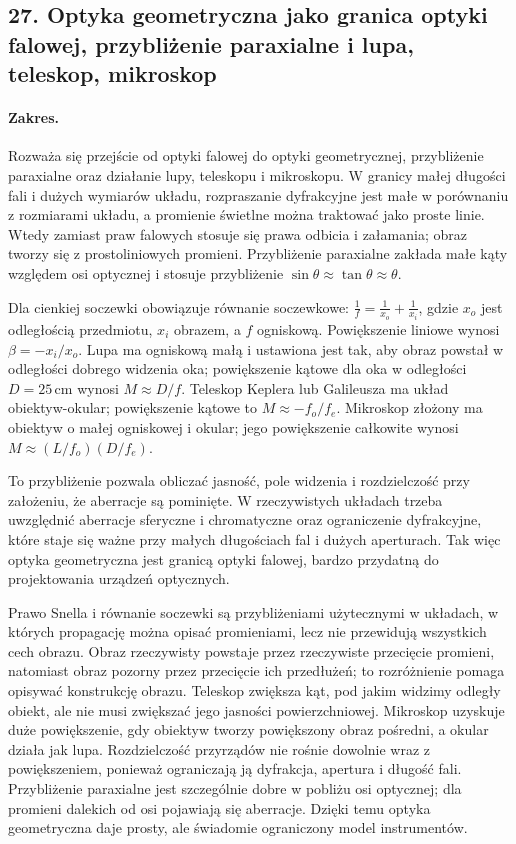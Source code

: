 \documentclass[11pt,a4paper]{article}
\begin{document}
\subsection{27. Optyka geometryczna jako granica optyki falowej, przybliżenie paraxialne i lupa, teleskop, mikroskop}
\paragraph{Zakres.} Rozważa się przejście od optyki falowej do optyki geometrycznej, przybliżenie paraxialne oraz działanie lupy, teleskopu i mikroskopu. W granicy małej długości fali i dużych wymiarów układu, rozpraszanie dyfrakcyjne jest małe w porównaniu z rozmiarami układu, a promienie świetlne można traktować jako proste linie. Wtedy zamiast praw falowych stosuje się prawa odbicia i załamania; obraz tworzy się z prostoliniowych promieni. Przybliżenie paraxialne zakłada małe kąty względem osi optycznej i stosuje przybliżenie $\sin\theta\approx\tan\theta\approx\theta$.\par
Dla cienkiej soczewki obowiązuje równanie soczewkowe: $\frac{1}{f}=\frac{1}{x_o}+\frac{1}{x_i}$, gdzie $x_o$ jest odległością przedmiotu, $x_i$ obrazem, a $f$ ogniskową. Powiększenie liniowe wynosi $\beta=-x_i/x_o$. Lupa ma ogniskową małą i ustawiona jest tak, aby obraz powstał w odległości dobrego widzenia oka; powiększenie kątowe dla oka w odległości $D=25\,\mathrm{cm}$ wynosi $M\approx D/f$. Teleskop Keplera lub Galileusza ma układ obiektyw-okular; powiększenie kątowe to $M\approx -f_o/f_e$. Mikroskop złożony ma obiektyw o małej ogniskowej i okular; jego powiększenie całkowite wynosi $M\approx (L/f_o)(D/f_e)$.\par
To przybliżenie pozwala obliczać jasność, pole widzenia i rozdzielczość przy założeniu, że aberracje są pominięte. W rzeczywistych układach trzeba uwzględnić aberracje sferyczne i chromatyczne oraz ograniczenie dyfrakcyjne, które staje się ważne przy małych długościach fal i dużych aperturach. Tak więc optyka geometryczna jest granicą optyki falowej, bardzo przydatną do projektowania urządzeń optycznych.\par

Prawo Snella i równanie soczewki są przybliżeniami użytecznymi w układach, w których propagację można opisać promieniami, lecz nie przewidują wszystkich cech obrazu. Obraz rzeczywisty powstaje przez rzeczywiste przecięcie promieni, natomiast obraz pozorny przez przecięcie ich przedłużeń; to rozróżnienie pomaga opisywać konstrukcję obrazu. Teleskop zwiększa kąt, pod jakim widzimy odległy obiekt, ale nie musi zwiększać jego jasności powierzchniowej. Mikroskop uzyskuje duże powiększenie, gdy obiektyw tworzy powiększony obraz pośredni, a okular działa jak lupa. Rozdzielczość przyrządów nie rośnie dowolnie wraz z powiększeniem, ponieważ ograniczają ją dyfrakcja, apertura i długość fali. Przybliżenie paraxialne jest szczególnie dobre w pobliżu osi optycznej; dla promieni dalekich od osi pojawiają się aberracje. Dzięki temu optyka geometryczna daje prosty, ale świadomie ograniczony model instrumentów.
\par
\end{document}
